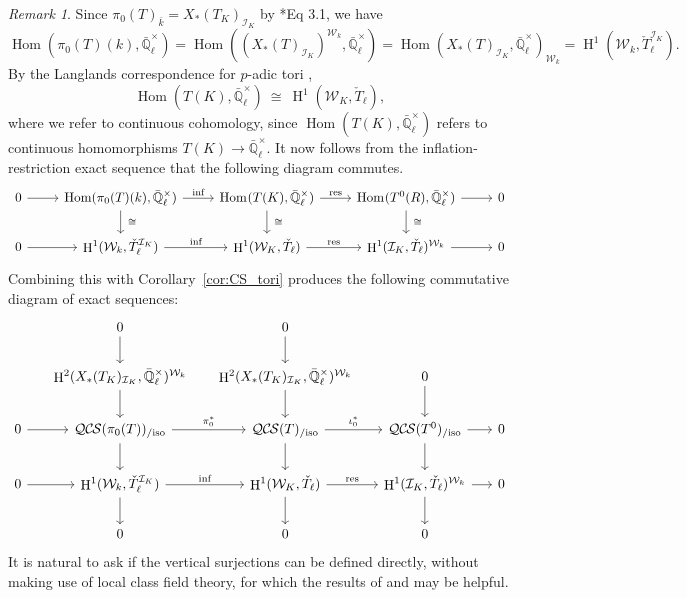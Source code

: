 \documentclass[10pt]{amsart}
\theoremstyle{plain}
\theoremstyle{definition}
\theoremstyle{remark}
\newtheorem{remark}[theorem]{Remark}
\newcommand{\EE}{\mathbb{\bar Q}_\ell}
\newcommand{\bFq}{\bar{k}}
\newcommand{\Fq}{k}
\newcommand{\EEx}{\EE^\times}
\newcommand{\Weil}[1]{\mathcal{W}_{#1}}
\DeclareMathOperator{\Hom}{Hom}
\DeclareMathOperator{\Hh}{H}
\newcommand{\iso}{{\ \cong\ }}
\newcommand{\QCS}{{\mathcal{QC\hskip-0.8pt S}}}
\newcommand{\QCSiso}[1]{\QCS(#1)_{/\text{iso}}}
\begin{document}
\begin{remark}
Since $\pi_0(T)_{\bFq} = X_*(T_K)_{\mathcal{I}_K}$ by \cite{bitan:discriminant}*{Eq 3.1}, we have
\[\Hom(\pi_0(T)(\Fq), \EEx)
= \Hom((X_*(T)_{\mathcal{I}_K})^{\Weil{\Fq}}, \EEx)
= \Hom(X_*(T)_{\mathcal{I}_K}, \EEx)_{\Weil{\Fq}} 
= \Hh^1(\Weil{\Fq}, \check{T}_\ell^{\mathcal{I}_K}).
\]
By the Langlands correspondence for $p$-adic tori \cite{yu:09a}, 
\[
\Hom(T(K), \EEx) 
\iso 
\Hh^1(\Weil{K}, \check{T}_\ell),
\]
where we refer to continuous cohomology, since $\Hom(T(K), \EEx)$ refers to continuous homomorphisms $T(K)\to \EEx$.
It now follows from the inflation-restriction exact sequence that the following diagram commutes.
\[
\begin{tikzcd}
   0 \arrow{r} & \Hom(\pi_0(T)(\Fq), \EEx) \arrow{r}{\text{inf}} \arrow{d}{\iso}
    & \arrow{d}{\iso} \Hom_\text{}(T(K),\EEx) \arrow{r}{\text{res}} & \Hom_\text{}(T^0(R),\EEx) \arrow{r} \arrow{d}{\iso} & 0\\    
    0 \arrow{r}  
 & \Hh^1(\Weil{\Fq}, \check{T}_\ell^{\mathcal{I}_K}) \arrow{r}{\text{inf}}
 & \Hh^1(\Weil{K}, \check{T}_\ell) \arrow{r}{\text{res}} 
 & \Hh^1(\mathcal{I}_K, \check{T}_\ell)^{\Weil{\Fq}} \arrow{r}  
 & 0
\end{tikzcd}
\] 
Combining this with Corollary~\ref{cor:CS_tori}  produces the following commutative diagram of exact sequences:
\begin{equation}\label{eq:GLCT}
  \begin{tikzcd}[row sep=20, column sep=15]
{}  & 0 \arrow{d} & 0 \arrow{d} &  & \\ 
   & \Hh^2(X_*(T_K)_{\mathcal{I}_K},\EEx)^{\Weil{\Fq}}  \arrow{d} & \arrow{d} \Hh^2(X_*(T_K)_{\mathcal{I}_K},\EEx)^{\Weil{\Fq}} & 0 \arrow{d} & \\
    0 \rar & \QCSiso{\pi_0(T)} \arrow{r}{\pi_0^*} \arrow{d}
    & \QCSiso{T} \arrow{r}{\iota_0^*}  \arrow{d} & \QCSiso{T^0} \arrow{r} \arrow{d} & 0\\
   0 \arrow{r}  
 & \Hh^1(\Weil{\Fq}, \check{T}_\ell^{\mathcal{I}_K}) \arrow{r}{\text{inf}} \arrow{d}
 & \Hh^1(\Weil{K}, \check{T}_\ell) \arrow{r}{\text{res}} \arrow{d}
 & \Hh^1(\mathcal{I}_K, \check{T}_\ell)^{\Weil{\Fq}} \arrow{r} \arrow{d}  
 & 0\\
 &  0  & 0 & 0 & 
  \end{tikzcd}
 \end{equation}
It is natural to ask if the vertical surjections can be defined directly, without making use of local class field theory, for which the results of \cite{suzuki-yoshida:12a}  and \cite{Suzuki:Neron} may be helpful.

\end{remark}
\end{document}

